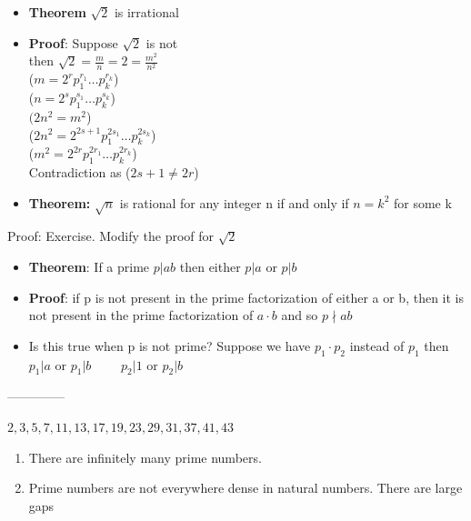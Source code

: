 \documentclass[9pt, letterpaper, oneside]{article}
\begin{document}
\begin{itemize}
    \item \textbf{Theorem} $\sqrt{2}$ is irrational
    \item \textbf{Proof}: Suppose $\sqrt{2}$ is not \\
    then $\sqrt{2} = \frac{m}{n} = 2 = \frac{m^2}{n^2}$ \\
    ($m = 2^r p_1^{r_1} \ldots p_k^{r_k}$)\\
    ($n = 2^s p_1^{s_1} \ldots p_k^{s_k}$)\\
    $(2n^2 = m^2$)\\
    ($2n^2 = 2^{2s+1} p_1^{2s_1} \ldots p_k^{2s_k}$)\\
    ($m^2 = 2^{2r} p_1^{2r_1} \ldots p_k^{2r_k}$)\\
    Contradiction as ($2s+1 \neq 2r$)
    \item \textbf{Theorem:} $\sqrt{n}$ is rational for any integer n if and only if $n = k^2$ for some k
\end{itemize}

Proof: Exercise. Modify the proof for $\sqrt{2}$

\begin{itemize}
    \item \textbf{Theorem}: If a prime $p | ab$ then either $p | a$ or $p| b$
    \item \textbf{Proof}: if p is not present in the prime factorization of either a or b, then it is not present in the prime factorization of $a \cdot b $ and so $p \nmid a b$
    \item Is this true when p is not prime? Suppose we have $p_1 \cdot p_2$ instead of $p_1$ then $p_1 | a$ or $p_1 | b \qquad$ $p_2 | 1$ or $p_2 | b$
\end{itemize}

--------------

$2,3,5,7,11,13,17,19,23,29,31,37,41,43$
\begin{enumerate}
    \item There are infinitely many prime numbers.
    \item Prime numbers are not everywhere dense in natural numbers. There are large gaps
\end{enumerate}
\end{document}
